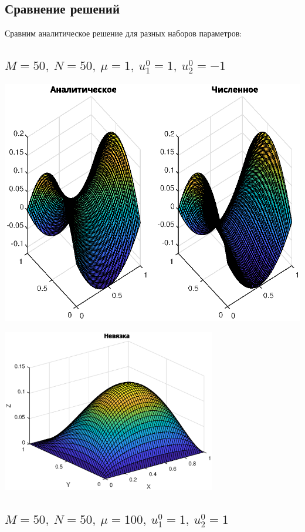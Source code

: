 \documentclass[11pt]{article}
\begin{document}
\subsection{Сравнение решений}

Сравним аналитическое решение для разных наборов параметров:


\subsection{$M = 50,\ N = 50,\ \mu= 1,\ u_1^0 = 1,\ u_2^0 = -1$}

\includegraphics[width=1.1\textwidth, height=0.5\textheight]{12.eps}

\includegraphics[width=0.7\textwidth]{11.eps}

\newpage
\subsection{$M = 50,\ N = 50,\ \mu= 100,\ u_1^0 = 1,\ u_2^0 = 1$}
\end{document}
